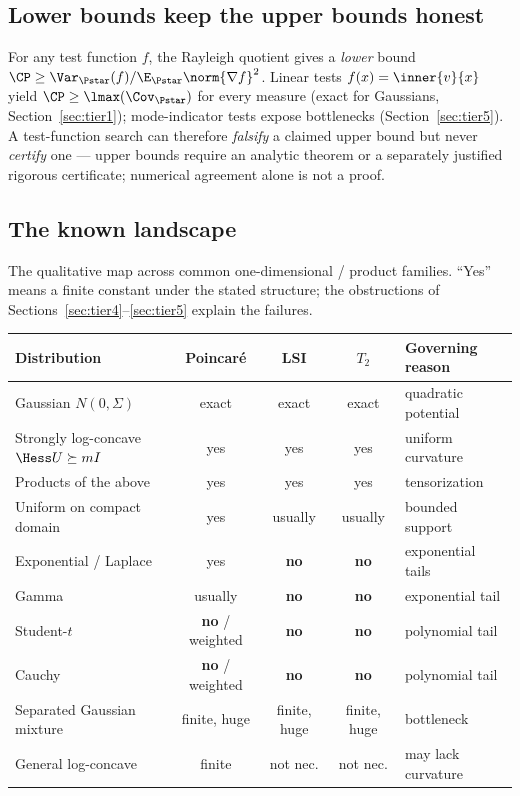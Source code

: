 \documentclass[../main.tex]{subfiles}
\begin{document}
\subsection{Lower bounds keep the upper bounds honest}
\label{subsec:lower-bounds}

\begin{remark}
\label{rem:rayleigh-lower-only}
For any test function $f$, the Rayleigh quotient gives a \emph{lower} bound
$\CP\ge\Var_{\Pstar}(f)/\E_{\Pstar}\norm{\nabla f}^2$. Linear tests $f(x)=\inner{v}{x}$ yield
$\CP\ge\lmax(\Cov_{\Pstar})$ for every measure (exact for Gaussians,
Section~\ref{sec:tier1}); mode-indicator tests expose bottlenecks (Section~\ref{sec:tier5}).
A test-function search can therefore \emph{falsify} a claimed upper bound but never
\emph{certify} one --- upper bounds require an analytic theorem or a separately justified rigorous
certificate; numerical agreement alone is not a proof.
\end{remark}

\subsection{The known landscape}
\label{subsec:landscape}

The qualitative map across common one-dimensional / product families. ``Yes'' means a finite
constant under the stated structure; the obstructions of Sections~\ref{sec:tier4}--\ref{sec:tier5}
explain the failures.

\begin{center}
\begin{tabularx}{\textwidth}{@{}p{} c c c Y@{}}
\toprule
Distribution & Poincar\'e & LSI & $T_2$ & Governing reason\\
\midrule
Gaussian $N(0,\Sigma)$              & exact & exact & exact & quadratic potential\\
Strongly log-concave $\Hess U\succeq mI$ & yes & yes & yes & uniform curvature\\
Products of the above               & yes & yes & yes & tensorization\\
Uniform on compact domain           & yes & usually & usually & bounded support\\
Exponential / Laplace               & yes & \textbf{no} & \textbf{no} & exponential tails\\
Gamma                               & usually & \textbf{no} & \textbf{no} & exponential tail\\
Student-$t$                         & \textbf{no} / weighted & \textbf{no} & \textbf{no} & polynomial tail\\
Cauchy                              & \textbf{no} / weighted & \textbf{no} & \textbf{no} & polynomial tail\\
Separated Gaussian mixture          & finite, huge & finite, huge & finite, huge & bottleneck\\
General log-concave                 & finite & not nec. & not nec. & may lack curvature\\
\bottomrule
\end{tabularx}
\end{center}
\end{document}
